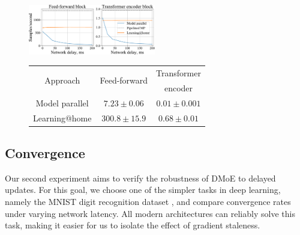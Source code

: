 \begin{figure}[h]
\vspace{-2px}
    \hspace{-24px}\begin{minipage}{0.6\textwidth}
        \centering
        \includegraphics[width=210px]{resources/throughput_new.pdf}
        \label{fig:throughput}
    \end{minipage}
    \hspace{-10px}
    \begin{minipage}{0.48\textwidth}
        \setlength{\tabcolsep}{2pt}
        \begin{tabular}{ccc}
        \toprule
        \multirow{2}{*}{Approach} & \multirow{2}{*}{Feed-forward}    & Transformer \\
                                  &            & encoder \\
        \midrule
        Model parallel & $7.23 \pm 0.06$ & $0.01 \pm 0.001$\\
        Learning@home  & $300.8\pm 15.9$  & $0.68 \pm 0.01$\\
        \bottomrule
        \end{tabular}
        \label{tab:cloudk80}
    \end{minipage}
\end{figure}

\vspace{-16px}

\subsection{Convergence}\label{sect:exp_convergence}
\vspace{-4px}

Our second experiment aims to verify the robustness of DMoE to delayed updates.
For this goal, we choose one of the simpler tasks in deep learning, namely the MNIST digit recognition dataset \cite{mnist}, and compare convergence rates under varying network latency. All modern architectures can reliably solve this task, making it easier for us to isolate the effect of gradient staleness.

